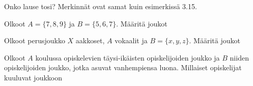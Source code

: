 
\begin{tehtavasivu}

\begin{tehtava}
     Onko lause tosi? 
Merkinnät ovat samat kuin esimerkissä 3.15.
    \begin{vastaus}
    
    \end{vastaus}
\end{tehtava}


\begin{tehtava}
 Olkoot $A = \{7, 8, 9\}$ ja $B=\{5, 6, 7\}$. Määritä joukot

    \begin{vastaus}
    \end{vastaus}
\end{tehtava}

\begin{tehtava}
     Olkoot perusjoukko $X$ aakkoset, $A$ vokaalit ja $B=\{x, y, z\}$.
Määritä joukot

    \begin{vastaus}
    
    \end{vastaus}
\end{tehtava}

\begin{tehtava}
     Olkoot $A$ koulussa opiskelevien täysi-ikäisten opiskelijoiden joukko ja $B$ niiden opiskelijoiden joukko, jotka asuvat vanhempiensa luona. Millaiset opiskelijat kuuluvat joukkoon


\end{tehtava}
\end{tehtavasivu}
